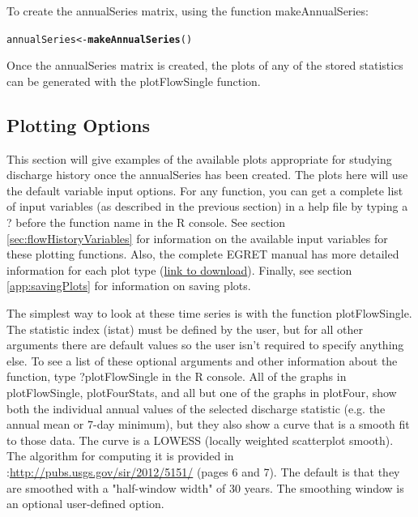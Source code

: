 \documentclass[a4paper,11pt]{article}\usepackage[]{graphicx}\usepackage[]{color}
\makeatletter
\newcommand{\hlstd}[1]{\textcolor[rgb]{0.345,0.345,0.345}{#1}}%
\newcommand{\hlkwb}[1]{\textcolor[rgb]{0.69,0.353,0.396}{#1}}%
\newcommand{\hlkwd}[1]{\textcolor[rgb]{0.737,0.353,0.396}{\textbf{#1}}}%
\newenvironment{kframe}{%
 \def\at@end@of@kframe{}%
 \ifinner\ifhmode%
  \def\at@end@of@kframe{\end{minipage}}%
  \begin{minipage}{\columnwidth}%
 \fi\fi%
 \def\FrameCommand##1{\hskip\@totalleftmargin \hskip-\fboxsep
 \colorbox{shadecolor}{##1}\hskip-\fboxsep
     \hskip-\linewidth \hskip-\@totalleftmargin \hskip\columnwidth}%
 \MakeFramed {\advance\hsize-\width
   \@totalleftmargin\z@ \linewidth\hsize
   \@setminipage}}%
 {\par\unskip\endMakeFramed%
 \at@end@of@kframe}
\newenvironment{knitrout}{}{} %
\makeatother
\begin{document}
To create the annualSeries matrix, using the function makeAnnualSeries:
\begin{knitrout}
\color{fgcolor}\begin{kframe}
\begin{alltt}
\hlstd{annualSeries} \hlkwb{<-} \hlkwd{makeAnnualSeries}\hlstd{()}
\end{alltt}
\end{kframe}
\end{knitrout}

Once the annualSeries matrix is created, the plots of any of the stored statistics can be generated with the plotFlowSingle function.

\FloatBarrier

\subsection{Plotting Options}
\label{sec:plotOptions}

\FloatBarrier

This section will give examples of the available plots appropriate for studying discharge history once the annualSeries has been created. The plots here will use the default variable input options.  For any function, you can get a complete list of input variables (as described in the previous section) in a help file by typing a ? before the function name in the R console. See section \ref{sec:flowHistoryVariables} for information on the available input variables for these plotting functions. Also, the complete EGRET manual has more detailed information for each plot type (\href{https://github.com/USGS-R/EGRET/raw/Documentation/draft+user+guide+for+EGRET+and+dataRetrieval+2014-04-14.pdf}{link to download}). Finally, see section \ref{app:savingPlots} for information on saving plots.

The simplest way to look at these time series is with the function plotFlowSingle. The statistic index (istat) must be defined by the user, but for all other arguments there are default values so the user isn't required to specify anything else. To see a list of these optional arguments and other information about the function, type ?plotFlowSingle in the R console. All of the graphs in plotFlowSingle, plotFourStats, and all but one of the graphs in plotFour, show both the individual annual values of the selected discharge statistic (e.g. the annual mean or 7-day minimum), but they also show a curve that is a smooth fit to those data.  The curve is a LOWESS (locally weighted scatterplot smooth).  The algorithm for computing it is provided in \cite{HirschV}:\url{http://pubs.usgs.gov/sir/2012/5151/}  (pages 6 and 7).  The default is that they are smoothed with a "half-window width" of 30 years.  The smoothing window is an optional user-defined option. 
\end{document}
